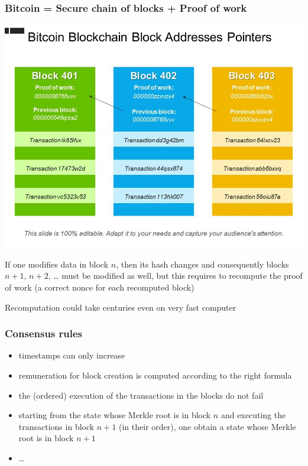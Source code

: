 \documentclass[11pt]{beamer}  %
\begin{document}
\begin{frame}\frametitle{Bitcoin = Secure chain of blocks + Proof of work}

  \begin{center}
    \includegraphics[scale=0.28,clip=false]{pictures/blocks-pow.jpg}
  \end{center}

  \smallskip

  If one modifies data in block $n$, then its hash changes and consequently
  blocks $n+1$, $n+2$, \ldots
  must be modified as well, but this requires to recompute the proof of work
  (a correct nonce for each recomputed block)

  \smallskip

  \begin{redbox}{}
    Recomputation could take centuries even on very fast computer
  \end{redbox}
\end{frame}

\begin{frame}\frametitle{Consensus rules}

  \begin{itemize}
  \item timestamps can only increase
  \item remuneration for block creation is computed according to the right formula
  \item the (ordered) execution of the transactions in the blocks do not fail
  \item starting from the state whose Merkle root is in block $n$ and executing
    the transactions in block $n+1$ (in their order), one obtain a state whose Merkle root is
    in block $n+1$
  \item \ldots
  \end{itemize}
\end{frame}
\end{document}
